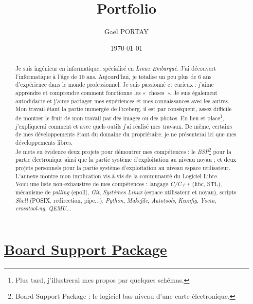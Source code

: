 \documentclass[a4paper]{article}
\title{Portfolio}
\author{Gaël PORTAY}
\date{\today}
\begin{document}
\sloppy
\maketitle

\begin{abstract}
Je suis ingénieur en informatique, spécialisé en \textit{Linux Embarqué}. J'ai découvert l'informatique à l'âge de 10 ans. Aujourd'hui, je totalise un peu plus de 6 ans d’expérience dans le monde professionnel. Je suis passionné et curieux : j'aime apprendre et comprendre comment fonctionne les «~choses~». Je suis également autodidacte et j'aime partager mes expériences et mes connaissances avec les autres.\\

Mon travail étant la partie immergée de l'iceberg, il est par conséquent, assez difficile de montrer le fruit de mon travail par des images ou des photos. En lieu et place\footnote{Plus tard, j'illustrerai mes propos par quelques schémas.}, j'expliquerai comment et avec quels outils j'ai réalisé mes travaux. De même, certains de mes développements étant du domaine du propriétaire, je ne présenterai ici que mes développements libres.\\

Je mets en évidence deux projets pour démontrer mes compétences : le \textit{BSP}\footnote{Board Support Package : le logiciel bas niveau d'une carte électronique.} pour la partie électronique ainsi que la partie système d'exploitation au niveau noyau ; et deux projets personnels pour la partie système d'exploitation au niveau espace utilisateur. L'annexe montre mon implication vis-à-vis de la communauté du Logiciel Libre.\\

Voici une liste non-exhaustive de mes compétences : langage \textit{C/C++} (libc, STL), mécanisme de \textit{polling} (epoll), \textit{Git}, \textit{Systèmes Linux} (espace utilisateur et noyau), scripts \textit{Shell} (POSIX, redirection, pipe...), \textit{Python}, \textit{Makefile}, \textit{Autotools}, \textit{Kconfig}, \textit{Yocto}, \textit{crosstool-ng}, \textit{QEMU}...
\end{abstract}
\clearpage

\tableofcontents
\clearpage

\part{\href{https://fr.wikipedia.org/wiki/Board_support_package}{Board Support Package}}
\end{document}
